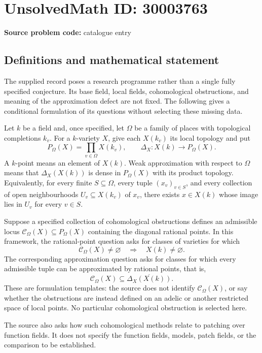 \documentclass[11pt]{article}
\begin{document}
\section*{UnsolvedMath ID: 30003763}
\textbf{Source problem code:} catalogue entry
\subsection{Definitions and mathematical statement}
The supplied record poses a research programme rather than a single fully specified conjecture. Its base field, local fields, cohomological obstructions, and meaning of the approximation defect are not fixed. The following gives a conditional formulation of its questions without selecting these missing data.

Let \(k\) be a field and, once specified, let \(\Omega\) be a family of places with topological completions \(k_v\). For a \(k\)-variety \(X\), give each \(X(k_v)\) its local topology and put
\[
P_\Omega(X)=\prod_{v\in\Omega}X(k_v),\qquad
\Delta_X:X(k)\longrightarrow P_\Omega(X).
\]
A \(k\)-point means an element of \(X(k)\). Weak approximation with respect to \(\Omega\) means that \(\Delta_X(X(k))\) is dense in \(P_\Omega(X)\) with its product topology. Equivalently, for every finite \(S\subseteq\Omega\), every tuple \((x_v)_{v\in S}\), and every collection of open neighbourhoods \(U_v\subseteq X(k_v)\) of \(x_v\), there exists \(x\in X(k)\) whose image lies in \(U_v\) for every \(v\in S\).

Suppose a specified collection of cohomological obstructions defines an admissible locus \(\mathcal C_\Omega(X)\subseteq P_\Omega(X)\) containing the diagonal rational points. In this framework, the rational-point question asks for classes of varieties for which
\[
\mathcal C_\Omega(X)\ne\varnothing\quad\Longrightarrow\quad X(k)\ne\varnothing.
\]
The corresponding approximation question asks for classes for which every admissible tuple can be approximated by rational points, that is,
\[
\mathcal C_\Omega(X)\subseteq
\overline{\Delta_X(X(k))}.
\]
These are formulation templates: the source does not identify \(\mathcal C_\Omega(X)\), or say whether the obstructions are instead defined on an adelic or another restricted space of local points. No particular cohomological obstruction is selected here.

The source also asks how such cohomological methods relate to patching over function fields. It does not specify the function fields, models, patch fields, or the comparison to be established.
\end{document}
